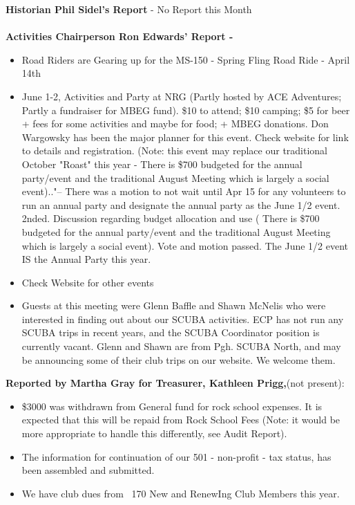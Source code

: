 \documentclass[10pt,a4paper]{article}
\begin{document}
\begin{multicols}{2}
\textbf{Historian Phil Sidel's Report} - No Report this Month
\\
\\
\textbf{Activities Chairperson Ron Edwards' Report - }
\begin{itemize}
\item Road Riders are Gearing up for the MS-150 - Spring Fling Road Ride - April 14th
\item June 1-2, Activities and Party at NRG (Partly hosted by ACE Adventures; Partly a fundraiser for MBEG fund).
\$10 to attend; \$10 camping; \$5 for beer  + fees for some activities and maybe for food;  + MBEG donations.
Don Wargowsky has been the major planner for this event.  Check website for link to details and registration.
(Note: this event may replace our traditional October "Roast" this year - There is \$700 budgeted for the annual party/event and the traditional August Meeting which is largely a social event).."-- There was a  motion to not wait until Apr 15 for any volunteers to run an annual party and designate the annual party as the June 1/2 event.  2nded.  Discussion regarding budget allocation and use ( There is \$700 budgeted for the annual party/event and the traditional August Meeting which is largely a social event).  Vote and motion passed.  The June 1/2 event IS the Annual Party this year. 
\item Check Website for other events
\item Guests at this meeting were Glenn Baffle and Shawn McNelis who were interested in finding out about our SCUBA activities.  ECP has not run any SCUBA trips in recent years, and the SCUBA Coordinator position is currently vacant.  Glenn and Shawn are from Pgh. SCUBA North, and may be announcing some of their club trips on our website.  We welcome them.
\end{itemize}


\textbf{Reported by Martha Gray for Treasurer, Kathleen Prigg,}(not present):\\
\begin{itemize}
\item \$3000 was withdrawn from General fund for rock school expenses.  It is expected that this will be repaid from Rock School Fees  (Note:  it would be more appropriate to handle this differently, see Audit Report).
\item The information for continuation of our 501 - non-profit - tax status, has been assembled and submitted.
\item We have club dues from ~170 New and RenewIng Club Members this year.
\end{itemize}


\end{multicols}
\end{document}
